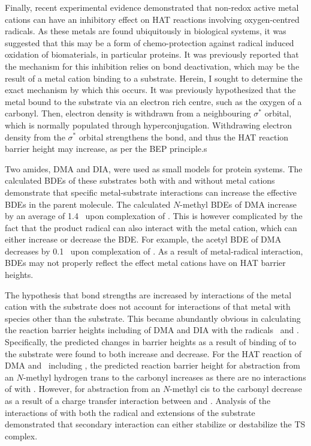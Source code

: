 \begin{doublespace}
Finally, recent experimental evidence demonstrated that non-redox active metal
cations can have an inhibitory effect on HAT reactions involving oxygen-centred
radicals. As these metals are found ubiquitously in biological systems, it was
suggested that this may be a form of chemo-protection against radical induced
oxidation of biomaterials, in particular proteins. It was previously reported
that the mechanism for this inhibition relies on  bond deactivation,
which may be the result of a metal cation binding to a substrate. Herein, I
sought to determine the exact mechanism by which this occurs. It was previously
hypothesized that the metal bound to the substrate via an electron rich centre,
such as the oxygen of a carbonyl. Then, electron density is withdrawn from a
neighbouring  $\sigma^*$ orbital, which is normally populated through
hyperconjugation. Withdrawing electron density from the  $\sigma^*$
orbital strengthens the bond, and thus the HAT reaction barrier height may
increase, as per the BEP principle.s

Two amides, DMA and DIA, were used as small models for protein systems. The
calculated  BDEs of these substrates both with and without metal cations
demonstrate that specific metal-substrate interactions can increase the
effective  BDEs in the parent molecule. The calculated $N$-methyl
 BDEs of DMA increase by an average of 1.4 \kcalmol\ upon complexation
of . This is however complicated by the fact that the product radical
can also interact with the metal cation, which can either increase or decrease
the BDE. For example, the acetyl  BDE of DMA decreases by 0.1 \kcalmol\
upon complexation of . As a result of metal-radical interaction, BDEs
may not properly reflect the effect metal cations have on HAT barrier heights.

The hypothesis that  bond strengths are increased by interactions of the
metal cation with the substrate does not account for interactions of that metal
with species other than the substrate. This became abundantly obvious in
calculating the reaction barrier heights including  of DMA and DIA with
the radicals \cumo\ and \bno. Specifically, the predicted changes in barrier
heights as a result of binding of  to the substrate were found to both
increase and decrease. For the HAT reaction of DMA and \cumo\ including
\ch{NaCl}, the predicted reaction barrier height for abstraction from an
$N$-methyl hydrogen trans to the carbonyl increases as there are no interactions
of \ch{NaCl} with \cumo. However, for abstraction from an $N$-methyl cis to the
carbonyl decrease as a result of a charge transfer interaction between 
and \cumo. Analysis of the interactions of \ch{NaCl} with both the radical and
extensions of the substrate demonstrated that secondary interaction can either
stabilize or destabilize the TS complex.


\end{doublespace}
